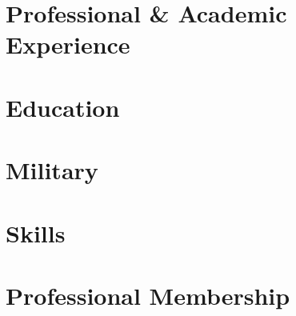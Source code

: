 \documentclass[letter,10pt]{article}
\begin{document}


\section{Professional \& Academic Experience}



\newpage

\section{Education}


\section{Military}


\section{Skills}



\section{Professional Membership}

\end{document}
